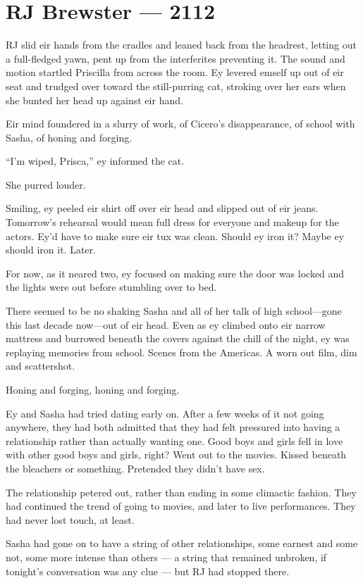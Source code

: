 \hypertarget{rj-brewster-2112}{%
\chapter*{RJ Brewster — 2112}\label{rj-brewster-2112}}

RJ slid eir hands from the cradles and leaned back from the headrest, letting out a full-fledged yawn, pent up from the interferites preventing it. The sound and motion startled Priscilla from across the room. Ey levered emself up out of eir seat and trudged over toward the still-purring cat, stroking over her ears when she bunted her head up against eir hand.

Eir mind foundered in a slurry of work, of Cicero's disappearance, of school with Sasha, of honing and forging.

``I'm wiped, Prisca,'' ey informed the cat.

She purred louder.

Smiling, ey peeled eir shirt off over eir head and slipped out of eir jeans. Tomorrow's rehearsal would mean full dress for everyone and makeup for the actors. Ey'd have to make sure eir tux was clean. Should ey iron it? Maybe ey should iron it. Later.

For now, as it neared two, ey focused on making sure the door was locked and the lights were out before stumbling over to bed.

There seemed to be no shaking Sasha and all of her talk of high school---gone this last decade now---out of eir head. Even as ey climbed onto eir narrow mattress and burrowed beneath the covers against the chill of the night, ey was replaying memories from school. Scenes from the Americas. A worn out film, dim and scattershot.

Honing and forging, honing and forging.

Ey and Sasha had tried dating early on. After a few weeks of it not going anywhere, they had both admitted that they had felt pressured into having a relationship rather than actually wanting one. Good boys and girls fell in love with other good boys and girls, right? Went out to the movies. Kissed beneath the bleachers or something. Pretended they didn't have sex.

The relationship petered out, rather than ending in some climactic fashion. They had continued the trend of going to movies, and later to live performances. They had never lost touch, at least.

Sasha had gone on to have a string of other relationships, some earnest and some not, some more intense than others — a string that remained unbroken, if tonight's conversation was any clue — but RJ had stopped there.

